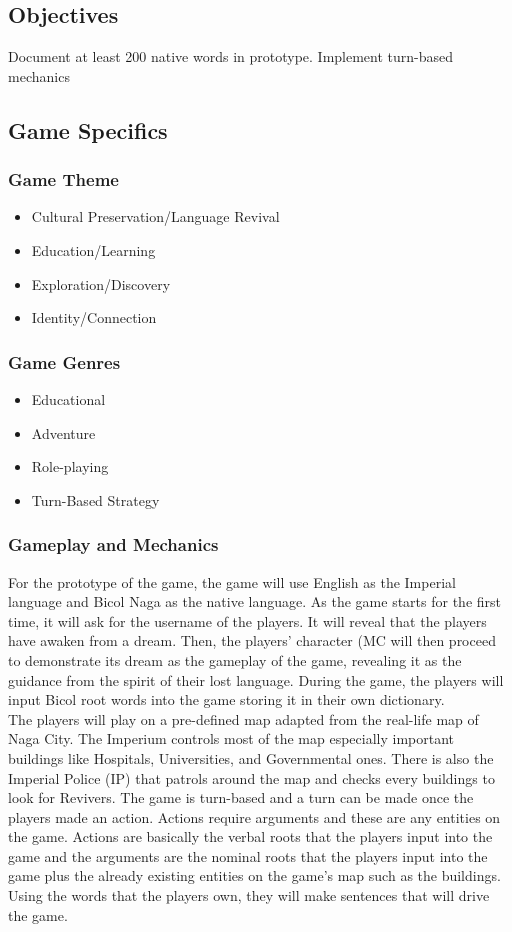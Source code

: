 \documentclass[11pt]{article}
\begin{document}
\subsection{Objectives}
Document at least 200 native words in prototype.
Implement turn-based mechanics

\subsection{Game Specifics}
\subsubsection{Game Theme}
\begin{itemize}
\item
  Cultural Preservation/Language Revival
\item
  Education/Learning
\item
  Exploration/Discovery
\item
  Identity/Connection
\end{itemize}

\subsubsection{Game Genres}
\begin{itemize}
\item
  Educational
\item
  Adventure
\item
  Role-playing
\item
  Turn-Based Strategy
\end{itemize}
  
\subsubsection{Gameplay and Mechanics}
For the prototype of the game, the game will use English as the Imperial language and Bicol Naga as the native language. As the game starts for the first time, it will ask for the username of the players. It will reveal that the players have awaken from a dream. Then, the players' character (MC will then proceed to demonstrate its dream as the gameplay of the game, revealing it as the guidance from the spirit of their lost language. During the game, the players will input Bicol root words into the game storing it in their own dictionary.\\
The players will play on a pre-defined map adapted from the real-life map of Naga City. The Imperium controls most of the map especially important buildings like Hospitals, Universities, and Governmental ones. There is also the Imperial Police (IP) that patrols around the map and checks every buildings to look for Revivers. The game is turn-based and a turn can be made once the players made an action. Actions require arguments and these are any entities on the game. Actions are basically the verbal roots that the players input into the game and the arguments are the nominal roots that the players input into the game plus the already existing entities on the game's map such as the buildings. Using the words that the players own, they will make sentences that will drive the game.\\
\end{document}

